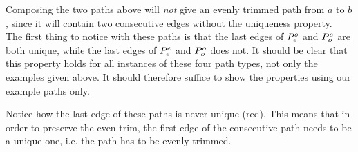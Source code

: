 Composing the two paths above will \textit{not} give an evenly trimmed path from $a$ to $b$, since it will contain two consecutive edges without the uniqueness property.\\

The first thing to notice with these paths is that the last edges of $P^o_e$ and $P^e_o$ are both unique, while the last edges of $P^e_e$ and $P^o_o$ does not.
It should be clear that this property holds for all instances of these four path types, not only the examples given above.  It should therefore suffice to show the properties using our example paths only.

Notice how the last edge of these paths is never unique (red).  This means that in order to preserve the even trim, the first edge of the consecutive path needs to be a unique one, i.e. the path has to be evenly trimmed.
